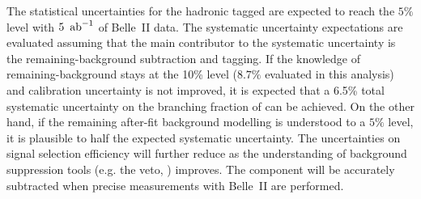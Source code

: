 \begin{table}[hbtp!]
    \centering
    \caption{\label{tab:btosgamma_projections}
    The projected uncertainties for the hadronic-tagged \BtoXsgamma with the increased Belle~II data set size.
    These projections are evaluated assuming the principal contributions in systematic uncertainty arise from
    background modelling and suppression uncertainties.
    The baseline case is presented for a scenario where the remaining good tag-\B meson background is known to $10\%$,
    whereas the improved scenario corresponds to where it is known to a $5\%$ accuracy.
    }
\end{table}

The statistical uncertainties for the hadronic tagged \BtoXsgamma are expected to reach the $5\%$ level with $5~\mbox{\,ab}^{-1}$ of Belle~II data.
The systematic uncertainty expectations are evaluated assuming that the main contributor to the systematic uncertainty
is the remaining-\BB background subtraction and \FEI tagging.
If the knowledge of remaining-\BB background stays at the 10\% level ($8.7\%$ evaluated in this analysis) and \FEI calibration uncertainty is not improved,
it is expected that a 6.5\% total systematic uncertainty on the branching fraction of \BtoXsgamma can be achieved.
On the other hand, if the remaining after-fit \BB background modelling is understood to a $5\%$ level, it is plausible to half the expected systematic uncertainty.
The uncertainties on signal selection efficiency will further reduce as the understanding of background suppression tools (e.g. the \piz veto, \ZMVA) improves.
The \BtoXdgamma component will be accurately subtracted when precise \BtoXdgamma measurements with Belle~II are performed.


